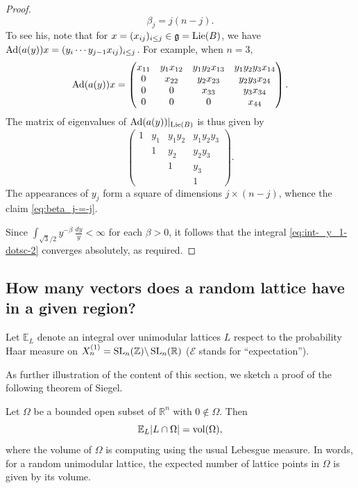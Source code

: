 \documentclass[reqno]{amsart} 
\begin{document}
\begin{proof}
\begin{equation}
    \beta_j = j ( n - j).
  \end{equation}
  To see his, note that for $x = (x_{i j})_{i \leq j} \in \mathfrak{g} = \operatorname{Lie}(B)$, we have $\operatorname{Ad}(a(y)) x = (y_i \dotsb y_{j-1} x_{i j})_{i \leq j}$.  For example, when $n = 3$,
  \begin{equation*}
    \operatorname{Ad}(a(y)) x =
    \begin{pmatrix}
      x _{1 1} & y_1 x_{1 2} & y _1 y _2 x _{1 3} &  y _1 y _2 y _3 x _{1 4} \\
      0 & x _{2 2} & y _2 x _{2 3 } & y _2 y _3 x _{2 4} \\
      0 & 0 & x _{3 3} & y _3 x _{3 4} \\
      0 & 0 & 0 & x _{4 4}
    \end{pmatrix}
    .
  \end{equation*}
  The matrix of eigenvalues of $\operatorname{Ad}(a(y))|_{\operatorname{Lie}(B)}$ is thus given by
  \begin{equation*}
    \begin{pmatrix}
      1 & y_1 & y _1 y _2  &  y _1 y _2 y _3  \\
        & 1 & y _2  & y _2 y _3  \\
        &  & 1  & y _3  \\
        & & & 1
    \end{pmatrix}
    .
  \end{equation*}
  The appearances of $y_j$ form a square of dimensions $j \times (n-j)$, whence the claim \eqref{eq:beta_j-=-j}.

  Since $\int_{\sqrt{3}/2} y^{-\beta} \, \frac{d y}{y} < \infty$ for each $\beta > 0$, it follows that the integral \eqref{eq:int-_y_1-dotsc-2} converges absolutely, as required.
\end{proof}


\subsection{How many vectors does a random lattice have in a given region?}
\label{sec:orge0ceafc}

Let $\mathbb{E}_{L}$ denote an integral over unimodular lattices $L$ respect to the probability Haar measure on $X_n^{(1)} = \operatorname{SL}_n(\mathbb{Z}) \backslash \operatorname{SL}_n(\mathbb{R})$ ($\mathcal{E}$ stands for ``expectation'').

As further illustration of the content of this section, we sketch a proof of the following theorem of Siegel.
\begin{theorem}
  Let $\Omega$ be a bounded open subset of $\mathbb{R}^n$ with $0 \notin \Omega$.  Then 
  \begin{equation*}
    \mathbb{E}_L | L \cap \Omega| = \operatorname{vol}(\Omega),
  \end{equation*}
  where the volume of $\Omega$ is computing using the usual Lebesgue measure.  In words, for a random unimodular lattice, the expected number of lattice points in $\Omega$ is given by its volume.
\end{theorem}
\end{document}

